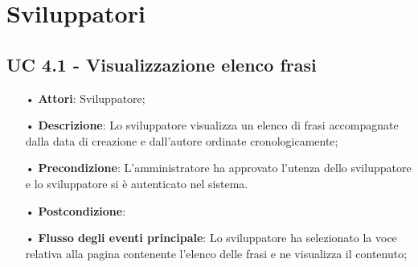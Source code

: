 \section{Sviluppatori}
\subsection{UC 4.1 - Visualizzazione elenco frasi}
\begin{itemize}
\item[•]\textbf{Attori}: Sviluppatore;
\item[•]\textbf{Descrizione}: Lo sviluppatore visualizza un elenco di frasi accompagnate dalla data di creazione e dall’autore ordinate cronologicamente;
\item[•]\textbf{Precondizione}:  L'amministratore ha approvato l’utenza dello sviluppatore e lo sviluppatore si è autenticato nel sistema.
\item[•]\textbf{Postcondizione}: 
\item[•]\textbf{Flusso degli eventi principale}: Lo sviluppatore ha selezionato la voce relativa alla pagina contenente l’elenco delle frasi e ne visualizza il contenuto; 
\end{itemize}
